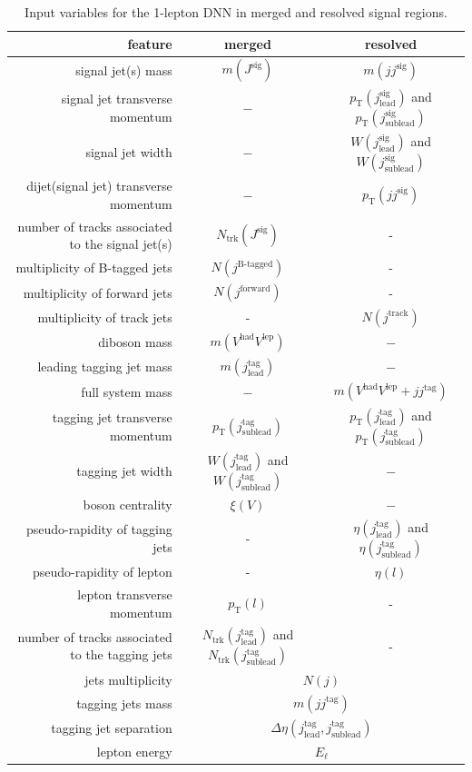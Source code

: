 \begin{table}[ht]
    \centering
    \begin{tabular}{r|c|c}
     feature & merged & resolved\\
     \hline
     \hline
     signal jet(s) mass & $m(J^\text{sig})$ & $m(jj^\text{sig})$\\
     signal jet transverse momentum & $ - $ & $p_\text{T}(j^\text{sig}_\text{lead})$ and  $p_\text{T}(j^\text{sig}_\text{sublead})$\\
     signal jet width & $ - $ & $W(j^\text{sig}_\text{lead})$ and  $W(j^\text{sig}_\text{sublead})$\\
     dijet(signal jet) transverse momentum & $ - $ & $p_\text{T}(jj^\text{sig})$\\
     number of tracks associated to the signal jet(s) & $N_\text{trk}(J^\text{sig})$ & -\\
     multiplicity of B-tagged jets & $N(j^\text{B-tagged})$ & -\\
     multiplicity of forward jets & $N(j^\text{forward})$ & -\\
     multiplicity of track jets & - & $N(j^\text{track})$\\
     diboson mass & $m(V^\text{had}V^\text{lep})$ & $ - $\\
     leading tagging jet mass & $m(j^\text{tag}_\text{lead})$ & $ - $\\
     full system mass & $ - $ & $m(V^\text{had}V^\text{lep}+jj^\text{tag})$\\
     tagging jet transverse momentum & $p_\text{T}(j^\text{tag}_\text{sublead})$ & $p_\text{T}(j^\text{tag}_\text{lead})$ and $p_\text{T}(j^\text{tag}_\text{sublead})$\\
     tagging jet width & $W(j^\text{tag}_\text{lead})$ and $W(j^\text{tag}_\text{sublead})$  & $ - $\\
     boson centrality & $\xi(V)$ & $ - $\\
     pseudo-rapidity of tagging jets & - & $\eta(j^\text{tag}_\text{lead})$ and $ \eta(j^\text{tag}_\text{sublead})$\\
     pseudo-rapidity of lepton & - & $\eta(l)$\\
     lepton transverse momentum & $p_\text{T}(l)$ & -\\
     number of tracks associated to the tagging jets & $N_\text{trk}(j^\text{tag}_\text{lead})$ and $N_\text{trk}(j^\text{tag}_\text{sublead})$ & -\\
     jets multiplicity & \multicolumn{2}{c}{$N(j)$}\\
     tagging jets mass & \multicolumn{2}{c}{$m(jj^\text{tag})$}\\
     tagging jet separation & \multicolumn{2}{c}{$\Delta\eta(j^\text{tag}_\text{lead},j^\text{tag}_\text{sublead})$}\\
     lepton energy & \multicolumn{2}{c}{$E_{\ell}$}\\
    \end{tabular}
    \caption{Input variables for the 1-lepton DNN in merged and resolved signal regions.}
    \label{tab:1lepNN}
\end{table}

